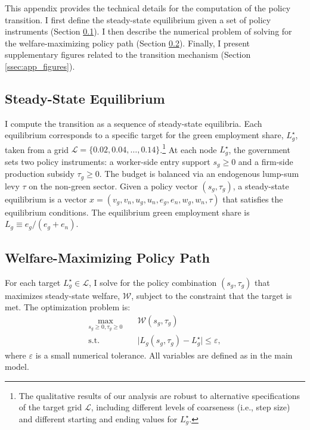 \documentclass[preprint,12pt]{elsarticle}
\begin{document}
This appendix provides the technical details for the computation of the policy transition. I first define the steady-state equilibrium given a set of policy instruments (Section \ref{ssec:app_equilibrium}). I then describe the numerical problem of solving for the welfare-maximizing policy path (Section \ref{ssec:app_policy_problem}). Finally, I present supplementary figures related to the transition mechanism (Section \ref{ssec:app_figures}).

\subsection{Steady-State Equilibrium}
\label{ssec:app_equilibrium}

I compute the transition as a sequence of steady-state equilibria. Each equilibrium corresponds to a specific target for the green employment share, $L_g^\star$, taken from a grid $\mathcal{L}=\{0.02, 0.04, \ldots, 0.14\}$.\footnote{The qualitative results of our analysis are robust to alternative specifications of the target grid $\mathcal{L}$, including different levels of coarseness (i.e., step size) and different starting and ending values for $L_g^\star$.} At each node $L_g^\star$, the government sets two policy instruments: a worker-side entry support $s_g \ge 0$ and a firm-side production subsidy $\tau_g \ge 0$. The budget is balanced via an endogenous lump-sum levy $\tau$ on the non-green sector. Given a policy vector $(s_g, \tau_g)$, a steady-state equilibrium is a vector $x=(v_g,v_n,u_g,u_n,e_g,e_n,w_g,w_n,\tau)$ that satisfies the equilibrium conditions. The equilibrium green employment share is $L_g \equiv e_g / (e_g+e_n)$.

\subsection{Welfare-Maximizing Policy Path}
\label{ssec:app_policy_problem}

For each target $L_g^\star \in \mathcal{L}$, I solve for the policy combination $(s_g, \tau_g)$ that maximizes steady-state welfare, $\mathcal{W}$, subject to the constraint that the target is met. The optimization problem is:
\begin{align*}
    \max_{s_g \ge 0, \tau_g \ge 0}\quad & \mathcal{W}(s_g, \tau_g) \\
    \text{s.t.}\quad & \big|L_g(s_g,\tau_g)-L_g^\star\big|\le \varepsilon,
\end{align*}
where $\varepsilon$ is a small numerical tolerance. All variables are defined as in the main model. 
\end{document}
